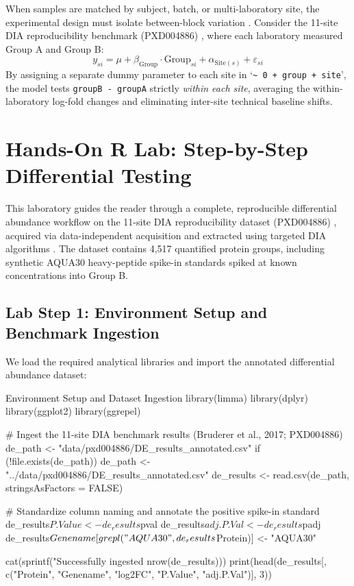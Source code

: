 \documentclass[11pt,twoside,openright]{book}
\begin{document}
When samples are matched by subject, batch, or multi-laboratory site, the experimental design must isolate between-block variation \cite{johnson2007adjusting, leek2010tackling}. Consider the 11-site DIA reproducibility benchmark (PXD004886) \cite{bruderer2017optimization}, where each laboratory measured Group A and Group B:
\begin{equation}
y_{si} = \mu + \beta_{\text{Group}} \cdot \text{Group}_{si} + \alpha_{\text{Site}(s)} + \varepsilon_{si}
\end{equation}
By assigning a separate dummy parameter to each site in `\texttt{\~{} 0 + group + site}', the model tests \texttt{groupB - groupA} strictly \textit{within each site}, averaging the within-laboratory log-fold changes and eliminating inter-site technical baseline shifts.

\section{Hands-On R Lab: Step-by-Step Differential Testing}

This laboratory guides the reader through a complete, reproducible differential abundance workflow on the 11-site DIA reproducibility dataset (PXD004886) \cite{bruderer2017optimization}, acquired via data-independent acquisition and extracted using targeted DIA algorithms \cite{rost2014openswath}. The dataset contains 4,517 quantified protein groups, including synthetic AQUA30 heavy-peptide spike-in standards spiked at known concentrations into Group B.

\subsection{Lab Step 1: Environment Setup and Benchmark Ingestion}

We load the required analytical libraries and import the annotated differential abundance dataset:

\begin{rchunk}{Environment Setup and Dataset Ingestion}
library(limma)
library(dplyr)
library(ggplot2)
library(ggrepel)

# Ingest the 11-site DIA benchmark results (Bruderer et al., 2017; PXD004886)
de_path <- "data/pxd004886/DE_results_annotated.csv"
if (!file.exists(de_path)) {
  de_path <- "../data/pxd004886/DE_results_annotated.csv"
}
de_results <- read.csv(de_path, stringsAsFactors = FALSE)

# Standardize column naming and annotate the positive spike-in standard
de_results$P.Value   <- de_results$pval
de_results$adj.P.Val <- de_results$padj
de_results$Genename[grepl("AQUA30", de_results$Protein)] <- "AQUA30"

cat(sprintf("Successfully ingested %
            nrow(de_results)))
print(head(de_results[, c("Protein", "Genename", "log2FC", "P.Value", "adj.P.Val")], 3))
\end{rchunk}
\end{document}

